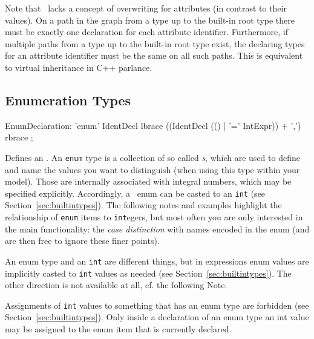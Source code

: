 Note that \GrG\ lacks a concept of overwriting for attributes (in contrast to their values).
On a path in the  graph from a type up to the built-in root type there must be exactly one declaration for each attribute identifier. Furthermore, if multiple paths from a type up to the built-in root type exist, the declaring types for an attribute identifier must be the same on all such paths.
This is equivalent to virtual inheritance in C++ parlance.

\pagebreak

\subsection{Enumeration Types}
\label{sct:enumtypes}
\begin{rail}
  EnumDeclaration: 'enum' IdentDecl lbrace ((IdentDecl (() | '=' IntExpr)) + ',') rbrace ;
\end{rail}
Defines an .
An \texttt{enum} type is a collection of so called \emph{s}, which are used to define and name the values you want to distinguish (when using this type within your model). 
Those are internally associated with integral numbers, which may be specified explicitly.
Accordingly, a \GrG\ enum can be casted to an \texttt{int} (see Section~\ref{sec:builtintypes}).
The following notes and examples highlight the relationship of \texttt{enum} items to \texttt{int}egers, but most often you are only interested in the main functionality: the \emph{case distinction} with names encoded in the enum (and are then free to ignore these finer points). 

\begin{note}
	An enum type and an {\tt int} are different things, but in expressions enum values are implicitly casted to {\tt int} values as needed (see Section~\ref{sec:builtintypes}). The other direction is not available at all, cf. the following Note.
\end{note}

\begin{warning}
	Assignments of {\tt int} values to something that has an enum type are forbidden (see Section~\ref{sec:builtintypes}).
	Only inside a declaration of an enum type an int value may be assigned to the enum item that is currently declared.
\end{warning}

